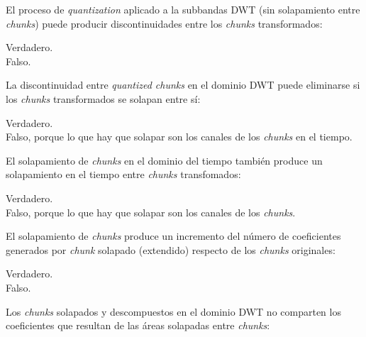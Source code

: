 \documentclass[legalpaper, 12pt, addpoints]{exam}
\begin{document}
\begin{questions}
\vspace{0.10in}

\question El proceso de \emph{quantization} aplicado a la subbandas
DWT (sin solapamiento entre \emph{chunks}) puede producir
discontinuidades entre los \emph{chunks} transformados:

\begin{oneparchoices}
  \choice Verdadero.\\
  \choice Falso.
\end{oneparchoices}
  
\vspace{0.10in}

\question La discontinuidad entre \emph{quantized chunks} en el dominio
DWT puede eliminarse si los \emph{chunks} transformados se solapan entre sí:

\begin{oneparchoices}
  \choice Verdadero.\\
  \choice Falso, porque lo que hay que solapar son los canales de los \emph{chunks} en el tiempo.
\end{oneparchoices}
  
\vspace{0.10in}

\question El solapamiento de \emph{chunks} en el dominio del tiempo
también produce un solapamiento en el tiempo entre \emph{chunks}
transfomados:

\begin{oneparchoices}
  \choice Verdadero.\\
  \choice Falso, porque lo que hay que solapar son los canales de los \emph{chunks}.
\end{oneparchoices}
  
\vspace{0.10in}

\question El solapamiento de \emph{chunks} produce un incremento del
número de coeficientes generados por \emph{chunk} solapado (extendido)
respecto de los \emph{chunks} originales:

\begin{oneparchoices}
  \choice Verdadero.\\
  \choice Falso.
\end{oneparchoices}
  
\vspace{0.10in}

\question Los \emph{chunks} solapados y descompuestos en el dominio
DWT no comparten los coeficientes que resultan de las áreas solapadas
entre \emph{chunks}:


\end{questions}
\end{document}

